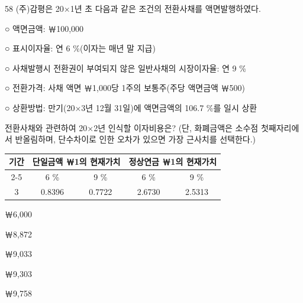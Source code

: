 \begin{question}{58}
(주)감평은 20×1년 초 다음과 같은 조건의 전환사채를 액면발행하였다.
\begin{framedtext}
○ 액면금액: ￦100,000 \par
○ 표시이자율: 연 6 \%(이자는 매년 말 지급) \par
○ 사채발행시 전환권이 부여되지 않은 일반사채의 시장이자율: 연 9 \% \par
○ 전환가격: 사채 액면 ￦1,000당 1주의 보통주(주당 액면금액 ￦500) \par
○ 상환방법: 만기(20×3년 12월 31일)에 액면금액의 106.7 \%를 일시 상환
\end{framedtext}
전환사채와 관련하여 20×2년 인식할 이자비용은? (단, 화폐금액은 소수점 첫째자리에서 반올림하며, 단수차이로 인한 오차가 있으면 가장 근사치를 선택한다.)
\par{\small\centering
\begin{tabular}{|c|c|c|c|c|}\hline
\multirow{2}{*}{기간} & \multicolumn{2}{c|}{단일금액 ￦1의 현재가치} & \multicolumn{2}{c|}{정상연금 ￦1의 현재가치} \\ \cline{2-5}
 & 6 \% & 9 \% & 6 \% & 9 \% \\ \hline
3 & 0.8396 & 0.7722 & 2.6730 & 2.5313 \\ \hline
\end{tabular}
\par}
\begin{choices}
  \item ￦6,000
  \item ￦8,872
  \item ￦9,033
  \item ￦9,303
  \item ￦9,758
\end{choices}
\end{question}
